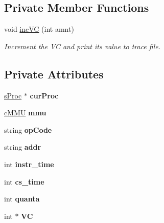 \subsection*{\-Private \-Member \-Functions}
\begin{DoxyCompactItemize}
\item 
\hypertarget{classcCPU_ab73f6117d304d13ae734c512b8cbfad9}{void \hyperlink{classcCPU_ab73f6117d304d13ae734c512b8cbfad9}{inc\-V\-C} (int amnt)}\label{d2/dc6/classcCPU_ab73f6117d304d13ae734c512b8cbfad9}

\begin{DoxyCompactList}\small\item\em \-Increment the \-V\-C and print its value to trace file. \end{DoxyCompactList}\end{DoxyCompactItemize}
\subsection*{\-Private \-Attributes}
\begin{DoxyCompactItemize}
\item 
\hypertarget{classcCPU_ac90262505cb425f05fd4555d628087ce}{\hyperlink{structsProc}{s\-Proc} $\ast$ {\bfseries cur\-Proc}}\label{d2/dc6/classcCPU_ac90262505cb425f05fd4555d628087ce}

\item 
\hypertarget{classcCPU_a7456c22a188891b9cba25954fe9c4137}{\hyperlink{classcMMU}{c\-M\-M\-U} {\bfseries mmu}}\label{d2/dc6/classcCPU_a7456c22a188891b9cba25954fe9c4137}

\item 
\hypertarget{classcCPU_a4bd0f722584edc32b505ff2a32c3ece1}{string {\bfseries op\-Code}}\label{d2/dc6/classcCPU_a4bd0f722584edc32b505ff2a32c3ece1}

\item 
\hypertarget{classcCPU_ada686dcf108f6501eda61c66de5c31db}{string {\bfseries addr}}\label{d2/dc6/classcCPU_ada686dcf108f6501eda61c66de5c31db}

\item 
\hypertarget{classcCPU_aab0009c65e70140c756837e32f445383}{int {\bfseries instr\-\_\-time}}\label{d2/dc6/classcCPU_aab0009c65e70140c756837e32f445383}

\item 
\hypertarget{classcCPU_a9843a71609c0c528df48e0b4c00000d7}{int {\bfseries cs\-\_\-time}}\label{d2/dc6/classcCPU_a9843a71609c0c528df48e0b4c00000d7}

\item 
\hypertarget{classcCPU_a97ad9f8d152ebd5140c4afcc1cfe8117}{int {\bfseries quanta}}\label{d2/dc6/classcCPU_a97ad9f8d152ebd5140c4afcc1cfe8117}

\item 
\hypertarget{classcCPU_ade969335c04f26cee3ab5ea511242a5f}{int $\ast$ {\bfseries \-V\-C}}\label{d2/dc6/classcCPU_ade969335c04f26cee3ab5ea511242a5f}

\end{DoxyCompactItemize}


